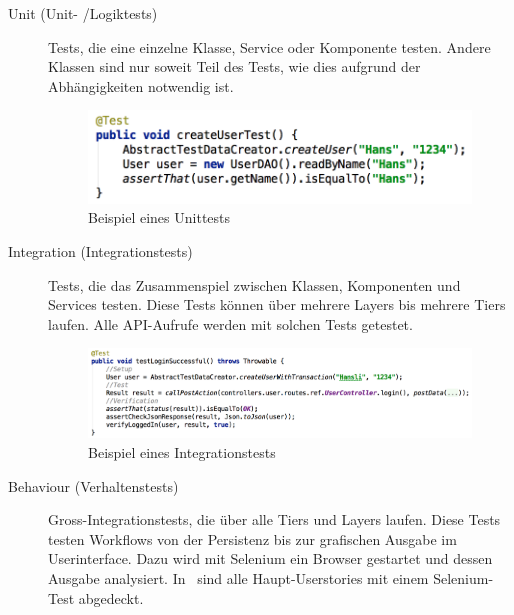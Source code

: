 			\begin{description}
				\item[Unit (Unit- /Logiktests)] Tests, die eine einzelne Klasse, 
					Service oder Komponente testen. 
					Andere Klassen sind nur soweit Teil des Tests, 
					wie dies aufgrund der Abhängigkeiten notwendig ist.
					\begin{figure}[H]
						\includegraphics[scale=0.5]{projectPlan/media/img/unitTest.png}
						\centering
						\caption{Beispiel eines Unittests}
						\label{fig:exampleUnittest}
					\end{figure}

				\item[Integration (Integrationstests)] Tests, die das Zusammenspiel zwischen Klassen, 
					Komponenten und Services testen. 
					Diese Tests können über mehrere Layers bis mehrere Tiers laufen.
					Alle API-Aufrufe werden mit solchen Tests getestet.
					\begin{figure}[H]
						\includegraphics[scale=0.5]{projectPlan/media/img/integrationTest.png}
						\centering
						\caption{Beispiel eines Integrationstests}
						\label{fig:exampleIntegrationtest}
					\end{figure}

				\item[Behaviour (Verhaltenstests)] Gross-Integrationstests, 
					die über alle Tiers und Layers laufen. 
					Diese Tests testen Workflows von der Persistenz 
					bis zur grafischen Ausgabe im Userinterface. 
					Dazu wird mit Selenium ein Browser gestartet und dessen Ausgabe analysiert.
					In \eeppi\ sind alle Haupt-Userstories mit einem Selenium-Test abgedeckt.
					

\end{description}
